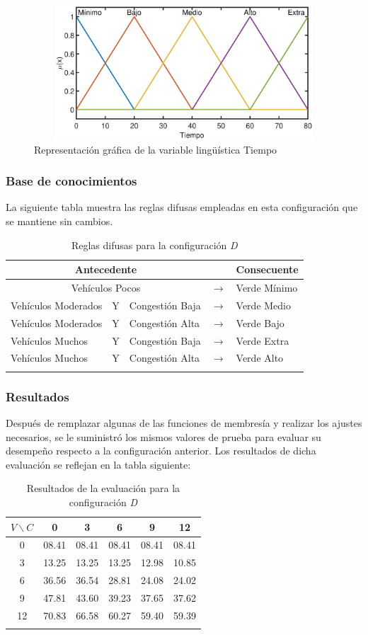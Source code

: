 \begin{figure}[H]
	\centering
	\includegraphics[height=5cm, width=12cm]{Variables/ConfigD_output1.eps}
	\caption[Gráfica variable lingüística tiempo - D]{Representación gráfica de la variable lingüística Tiempo}
\end{figure}

\subsubsection{Base de conocimientos}
La siguiente tabla muestra las reglas difusas empleadas en esta configuración que se mantiene sin cambios.
\begin{longtable}[c]{lclcl} \toprule
	\multicolumn{3}{c}{Antecedente} & & Consecuente \\ \midrule
	\multicolumn{3}{c}{Vehículos Pocos} & $\rightarrow$ & Verde Mínimo \\
	Vehículos Moderados & Y & Congestión Baja& $\rightarrow$ & Verde Medio \\
	Vehículos Moderados & Y & Congestión Alta& $\rightarrow$ & Verde Bajo \\
	Vehículos Muchos &Y& Congestión Baja& $\rightarrow$ & Verde Extra \\
	Vehículos Muchos &Y& Congestión Alta& $\rightarrow$ & Verde Alto \\ \hline
	\caption{Reglas difusas para la configuración \textit{D}}
\end{longtable}

\pagebreak
\subsubsection{Resultados}
Después de remplazar algunas de las funciones de membresía y realizar los ajustes necesarios, se le suministró los mismos valores de prueba para evaluar su desempeño respecto a la configuración anterior. Los resultados de dicha evaluación se reflejan en la tabla siguiente:

\begin{longtable}[c]{cccccc} \toprule
	$V \backslash C$ &  0 & 3 & 6 & 9 & 12 \\ \midrule
	0 & 08.41 & 08.41 & 08.41 & 08.41 & 08.41 \\
	3 & 13.25 & 13.25 & 13.25 & 12.98 & 10.85 \\
	6 & 36.56 & 36.54 & 28.81 & 24.08 & 24.02 \\
	9 & 47.81 & 43.60 & 39.23 & 37.65 & 37.62 \\
	12& 70.83 & 66.58 & 60.27 & 59.40 & 59.39 \\
	\caption{Resultados de la evaluación para la configuración \textit{D}}
\end{longtable}

